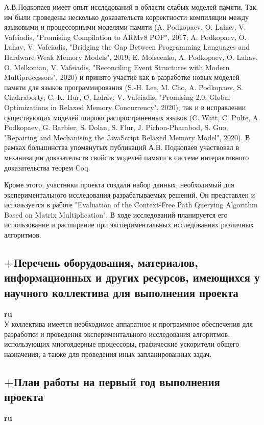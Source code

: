 \documentclass[12pt]{article}  %
\theoremstyle{remark}
\begin{document}
А.В.Подкопаев имеет опыт исследований в области слабых моделей памяти. Так, им были проведены несколько
доказательств корректности компиляции между языковыми и процессорными моделями памяти
(A. Podkopaev, O. Lahav, V. Vafeiadis, "Promising Compilation to ARMv8 POP", 2017;
A. Podkopaev, O. Lahav, V. Vafeiadis, "Bridging the Gap Between Programming Languages and Hardware Weak Memory Models", 2019;
E. Moiseenko, A. Podkopaev, O. Lahav, O. Melkonian, V. Vafeiadis, "Reconciling Event Structures with Modern Multiprocessors", 2020)
и принято участие как в разработке новых моделей памяти для языков программирования
(S.-H. Lee, M. Cho, A. Podkopaev, S. Chakraborty, C.-K. Hur, O. Lahav, V. Vafeiadis, "Promising 2.0: Global Optimizations in Relaxed Memory Concurrency", 2020),
так и в исправлении существующих моделей широко распространенных языков
(C. Watt, C. Pulte, A. Podkopaev, G. Barbier, S. Dolan, S. Flur, J. Pichon-Pharabod, S. Guo,
"Repairing and Mechanising the JavaScript Relaxed Memory Model", 2020).
В рамках большинства упомянутых публикаций А.В. Подкопаев участвовал в механизации доказательств свойств моделей памяти
в системе интерактивного доказательства теорем Coq.

Кроме этого, участники проекта создали набор данных, необходимый для экспериментального исследования разрабатываемых решений. Он представлен и используется в работе "Evaluation of the Context-Free Path Querying Algorithm Based on Matrix Multiplication". В ходе исследований планируется его использование и расширение при экспериментальных исследованиях различных алгоритмов.


\subsection{+Перечень оборудования, материалов, информационных и других ресурсов, имеющихся у научного коллектива для выполнения проекта}
\textbf{ru}\\
%
У коллектива имеется необходимое аппаратное и программное обеспечения для разработки и проведения экспериментального исследования алгоритмов, использующих многоядерные процессоры, графические ускорители общего назначения, а также для проведения иных запланированных задач.

\subsection{+План работы на первый год выполнения проекта}

\textbf{ru}\\
\end{document}
